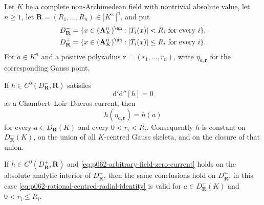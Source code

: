
\begin{proposition}\label{prop:p062-rational-centred-traces}
Let \(K\) be a complete non-Archimedean field with nontrivial absolute
value, let \(n\geq 1\), let
\(\mathbf R=(R_1,\ldots,R_n)\in |K^\times|^n\), and put
\[
 \begin{aligned}
 D^-_{\mathbf R}
  &=\{x\in(\mathbf A^n_K)^{\an}:|T_i(x)|<R_i
                       \text{ for every }i\},\\
 D^+_{\mathbf R}
  &=\{x\in(\mathbf A^n_K)^{\an}:|T_i(x)|\leq R_i
                       \text{ for every }i\}.
 \end{aligned}
\]
For \(a\in K^n\) and a positive polyradius
\(\mathbf r=(r_1,\ldots,r_n)\), write
\(\eta_{a,\mathbf r}\) for the corresponding Gauss point.

If \(h\in C^0(D^-_{\mathbf R},\mathbf R)\) satisfies
\begin{equation}\label{eq:p062-arbitrary-field-zero-current}
                       \mathrm d'\mathrm d''[h]=0
\end{equation}
as a Chambert--Loir--Ducros current, then
\begin{equation}\label{eq:p062-rational-centred-radial-identity}
                         h(\eta_{a,\mathbf r})=h(a)
\end{equation}
for every \(a\in D^-_{\mathbf R}(K)\) and every
\(0<r_i<R_i\).  Consequently \(h\) is constant on
\(D^-_{\mathbf R}(K)\), on the union of all \(K\)-centred Gauss
skeleta, and on the closure of that union.

If \(h\in C^0(D^+_{\mathbf R},\mathbf R)\) and
\eqref{eq:p062-arbitrary-field-zero-current} holds on the absolute
analytic interior of \(D^+_{\mathbf R}\), then the same conclusions hold
on \(D^+_{\mathbf R}\); in this case
\eqref{eq:p062-rational-centred-radial-identity} is valid for
\(a\in D^+_{\mathbf R}(K)\) and \(0<r_i\leq R_i\).
\end{proposition}

